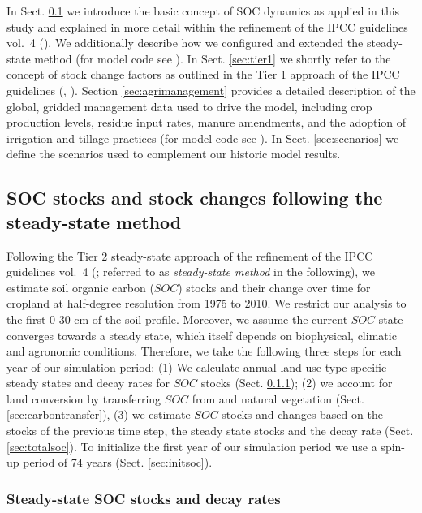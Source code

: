 \documentclass[gc, manuscript]{copernicus}
\begin{document}
In Sect. \ref{sec:carbonbudget} we introduce the basic concept of SOC dynamics as applied in this study and explained in more detail within the refinement of the IPCC guidelines vol.~4 (\citep{calvo_buendia_ipcc_2019}). We additionally describe how we configured and extended the steady-state method (for model code see \citep{karstens_mrsoil_2020}). In Sect. \ref{sec:tier1} we shortly refer to the concept of stock change factors as outlined in the Tier 1 approach of the IPCC guidelines (\citep{ipcc_eggleston_2006}, \citep{calvo_buendia_ipcc_2019}).
Section \ref{sec:agrimanagement} provides a detailed description of the global, gridded management data used to drive the model, including crop production levels, residue input rates, manure amendments, and the adoption of irrigation and tillage practices (for model code see \citet{mrcommons_2020}). In Sect. \ref{sec:scenarios} we define the scenarios used to complement our historic model results.

\hypertarget{sec:carbonbudget}{%
\subsection{SOC stocks and stock changes following the steady-state method}\label{sec:carbonbudget}}

Following the Tier 2 steady-state approach of the refinement of the IPCC guidelines vol.~4 (\citep{calvo_buendia_ipcc_2019}; referred to as \textit{steady-state method} in the following), we estimate soil organic carbon (\(SOC\)) stocks and their change over time for cropland at half-degree resolution from 1975 to 2010. We restrict our analysis to the first 0-30 cm of the soil profile. Moreover, we assume the current \(SOC\) state converges towards a steady state, which itself depends on biophysical, climatic and agronomic conditions.
Therefore, we take the following three steps for each year of our simulation period:
(1) We calculate annual land-use type-specific steady states and decay rates for \(SOC\) stocks (Sect. \ref{sec:steadystates});
(2) we account for land conversion by transferring \(SOC\) from and natural vegetation (Sect. \ref{sec:carbontransfer}),
(3) we estimate \(SOC\) stocks and changes based on the stocks of the previous time step, the steady state stocks and the decay rate (Sect. \ref{sec:totalsoc}).
To initialize the first year of our simulation period we use a spin-up period of 74 years (Sect. \ref{sec:initsoc}).

\hypertarget{sec:steadystates}{%
\subsubsection{Steady-state SOC stocks and decay rates}\label{sec:steadystates}}
\end{document}
